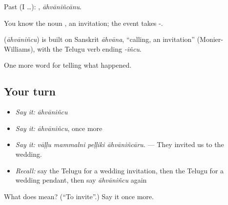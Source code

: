 Past (I …): , \emph{āhvāniñcānu}.

You know the noun , an invitation; the event takes -.

\begin{cousinweb}
\textbf{} (\emph{āhvāniñcu}) is built on Sanskrit \emph{āhvāna}, \textquotedblleft{}calling, an invitation\textquotedblright{} (Monier-Williams), with the Telugu verb ending \emph{-iñcu}.
\end{cousinweb}

\begin{grammarlens}[title={What you've built}]
One more word for telling what happened.
\end{grammarlens}

\subsection*{Your turn}
\begin{itemize}
\raggedright
  \item \emph{Say it:} \emph{āhvāniñcu}
  \item \emph{Say it:} \emph{āhvāniñcu}, once more
  \item \emph{Say it:} \emph{vāḷḷu mammalni peḷḷiki āhvāniñcāru.} — They invited us to the wedding.
  \item \emph{Recall:} say the Telugu for a wedding invitation, then the Telugu for a wedding pendant, then say \emph{āhvāniñcu} again
\end{itemize}

\begin{tcolorbox}[breakable,colback=teal!4,colframe=teal!35!black,title={Before you move on}]
What does  mean? (\textquotedblleft{}To invite\textquotedblright{}.) Say it once more.
\end{tcolorbox}
